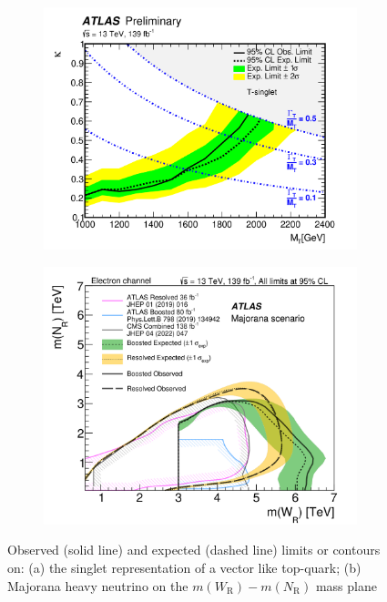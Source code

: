 \documentclass{moriond}
\begin{document}
\begin{figure}[htp]
     \centering
     \begin{subfigure}[b]{0.35\textwidth}
         \centering
         \includegraphics[width=\textwidth]{VLQ}
         \caption{}
         \label{fig:vlq}
     \end{subfigure}
     \begin{subfigure}[b]{0.32\textwidth}
         \centering
         \includegraphics[width=\textwidth]{RHN}
         \caption{}
         \label{fig:rhn}
     \end{subfigure}
     \caption{Observed (solid line) and expected (dashed line) limits or contours on: (a) the singlet representation of a vector like top-quark\protect\cite{vlq}; (b) Majorana heavy neutrino on the $m(W_{\mathrm{R}})-m(N_{\mathrm{R}})$ mass plane\protect\cite{rhn}}
     \label{fig:limits1}
\end{figure}
\end{document}
